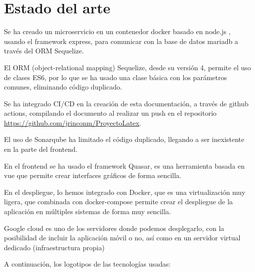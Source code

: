 \documentclass[11pt,spanish,listoffigures,listoftables]{tfgetsinf}
\begin{document}


\chapter{Estado del arte}

Se ha creado un microservicio en un contenedor docker basado en node.js , usando el framework express, para comunicar con la base de datos mariadb a través del ORM Sequelize. 

El ORM (object-relational mapping) Sequelize, desde su versión 4, permite el uso de clases ES6, por lo que se ha usado una clase básica con los parámetros comunes, eliminando código duplicado.

Se ha integrado CI/CD en la creación de esta documentación, a través de github actions, compilando el documento al realizar un push en el repositorio \url{https://github.com/jrinconm/ProyectoLatex}.

El uso de Sonarqube ha limitado el código duplicado, llegando a ser inexistente en la parte del frontend.

En el frontend se ha usado el framework Quasar, es una herramienta basada en vue que permite crear interfaces gráficos de forma sencilla.

En el despliegue, lo hemos integrado con Docker, que es una virtualización muy ligera, que combinada con docker-compose permite crear el despliegue de la aplicación en múltiples sistemas de forma muy sencilla.

Google cloud es uno de los servidores donde podemos desplegarlo, con la posibilidad de incluir la aplicación móvil o no, así como en un servidor virtual dedicado (infraestructura propia)

A continuación, los logotipos de las tecnologías usadas:
\end{document}
